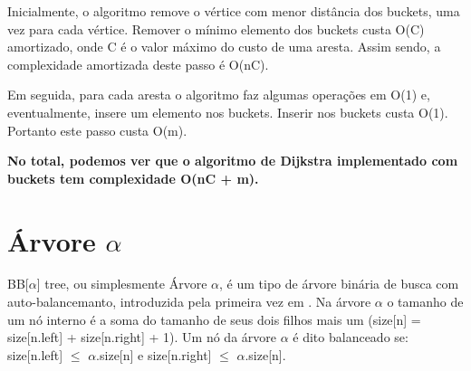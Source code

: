 \documentclass[
	12pt,				%
	oneside,			%
	a4paper,			%
	english,			%
	french,				%
	spanish,			%
	brazil,				%
	]{abntex2}
\begin{document}
Inicialmente, o algoritmo remove o vértice com menor distância dos buckets, uma vez para cada vértice. Remover o mínimo elemento dos buckets custa O(C) amortizado, onde C é o valor máximo do custo de uma aresta. Assim sendo, a complexidade amortizada deste passo é O(nC).

Em seguida, para cada aresta o algoritmo faz algumas operações em O(1) e, eventualmente, insere um elemento nos buckets. Inserir nos buckets custa O(1). Portanto este passo custa O(m).

\textbf{No total, podemos ver que o algoritmo de Dijkstra implementado com buckets tem complexidade O(nC + m).}

\section{Árvore $\alpha$}

BB[$\alpha$] tree, ou simplesmente Árvore $\alpha$, é um tipo de árvore binária de busca com auto-balancemanto, introduzida pela primeira vez em \cite{nievergelt1973binary}. Na árvore $\alpha$ o tamanho de um nó interno é a soma do tamanho de seus dois filhos mais um (size[n] = size[n.left] + size[n.right] + 1). Um nó da árvore $\alpha$ é dito balanceado se: size[n.left] $\le$ $\alpha$.size[n] e size[n.right] $\le$ $\alpha$.size[n].
\end{document}
